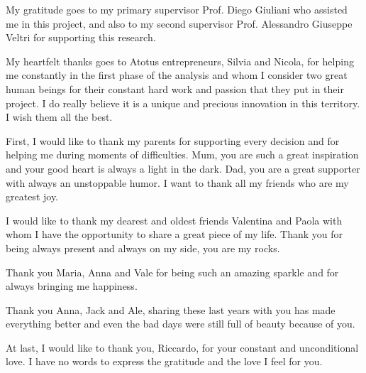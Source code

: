 \documentclass[%
    corpo=12pt,
    twoside, %
    oldstyle,
    autoretitolo,
    greek,
    evenboxes,
]{toptesi}
\begin{document}
My gratitude goes to my primary supervisor Prof. Diego Giuliani who assisted me in this project, and also to my second supervisor Prof. Alessandro Giuseppe Veltri for supporting this research.

My heartfelt thanks goes to Atotus entrepreneurs, Silvia and Nicola, for helping me constantly in the first phase of the analysis and whom I consider two great human beings for their constant hard work and passion that they put in their project. I do really believe it is a unique and precious innovation in this territory. I wish them all the best.

First, I would like to thank my parents for supporting every decision and for helping me during moments of difficulties. Mum, you are such a great inspiration and your good heart is always a light in the dark. Dad, you are a great supporter with always an unstoppable humor.
I want to thank all my friends who are my greatest joy. 

I would like to thank my dearest and oldest friends Valentina and Paola with whom I have the opportunity to share a great piece of my life. Thank you for being always present and always on my side, you are my rocks.

Thank you Maria, Anna and Vale for being such an amazing sparkle and for always bringing me happiness. 

Thank you Anna, Jack and Ale, sharing these last years with you has made everything better and even the bad days were still full of beauty because of you.

At last, I would like to thank you, Riccardo, for your constant and unconditional love. I have no words to express the gratitude and the love I feel for you. 





\end{document}
